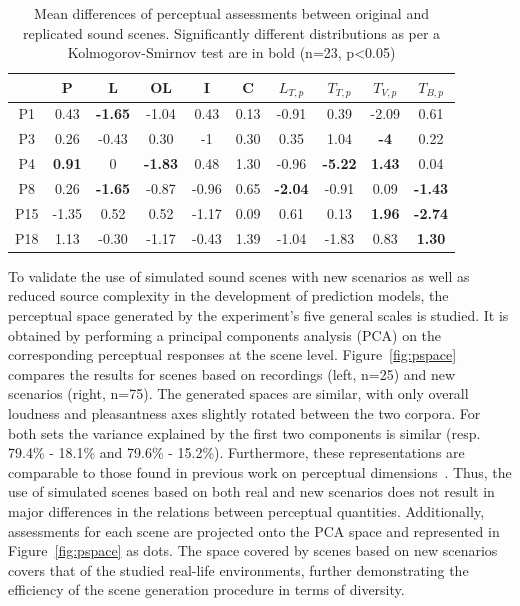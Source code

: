 \documentclass[11pt,a4paper]{article}
\begin{document}
\begin{table}[h]
\centering
\caption{Mean differences of perceptual assessments between original and replicated sound scenes. Significantly different distributions as per a Kolmogorov-Smirnov test are in bold (n=23, p<0.05)}
\label{tab:ogrep}
\begin{tabular}{ c | c c c c c c c c c }
\hline
	 & P & L & OL & I & C & $L_{T, p}$ & $T_{T, p}$ & $T_{V, p}$ & $T_{B, p}$ \\ \hline
	P1 & 0.43 & \textbf{-1.65} & -1.04 & 0.43 & 0.13 & -0.91 & 0.39 & -2.09 & 0.61 \\
	P3 & 0.26 & -0.43 & 0.30 & -1 & 0.30 & 0.35 & 1.04 & \textbf{-4} & 0.22 \\
	P4 & \textbf{0.91} & 0 & \textbf{-1.83} & 0.48 & 1.30 & -0.96 & \textbf{-5.22} & \textbf{1.43} & 0.04 \\
	P8 & 0.26 & \textbf{-1.65} & -0.87 & -0.96 & 0.65 & \textbf{-2.04} & -0.91 & 0.09 & \textbf{-1.43} \\
	P15 & -1.35 & 0.52 & 0.52 & -1.17 & 0.09 & 0.61 & 0.13 & \textbf{1.96} & \textbf{-2.74} \\
	P18 & 1.13 & -0.30 & -1.17 & -0.43 & 1.39 & -1.04 & -1.83 & 0.83 & \textbf{1.30} \\ \hline
\end{tabular}
\end{table}

To validate the use of simulated sound scenes with new scenarios as well as reduced source complexity in the development of prediction models, the perceptual space generated by the experiment's five general scales is studied. It is obtained by performing a principal components analysis (PCA) on the corresponding perceptual responses at the scene level. Figure~\ref{fig:pspace} compares the results for scenes based on recordings (left, n=25) and new scenarios (right, n=75). The generated spaces are similar, with only overall loudness and pleasantness axes slightly rotated between the two corpora. For both sets the variance explained by the first two components is similar (resp. 79.4\% - 18.1\% and 79.6\% - 15.2\%). Furthermore, these representations are comparable to those found in previous work on perceptual dimensions~\cite{axelsson2010, cain2013}. Thus, the use of simulated scenes based on both real and new scenarios does not result in major differences in the relations between perceptual quantities. Additionally, assessments for each scene are projected onto the PCA space and represented in Figure~\ref{fig:pspace} as dots. The space covered by scenes based on new scenarios covers that of the studied real-life environments, further demonstrating the efficiency of the scene generation procedure in terms of diversity.\\
\end{document}
